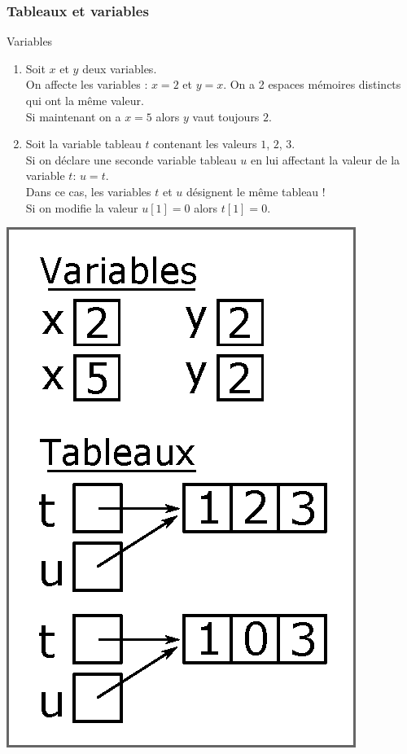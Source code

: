 \documentclass[9pt]{beamer}
\newcounter{num}
\begin{document}
\begin{frame}
\frametitle{Tableaux et variables}

\begin{block}{Variables}
\begin{minipage}{0.7\textwidth}
\begin{enumerate}
\item Soit $x$ et $y$ deux variables.\\
On affecte les variables : $x=2$ et $y=x$. On a 2 espaces mémoires distincts qui ont la même valeur.\\
Si maintenant on a $x=5$ alors $y$ vaut toujours $2$.
\item Soit la variable tableau $t$ contenant les valeurs $1$, $2$, $3$.\\
Si on déclare une seconde variable tableau $u$ en lui affectant la valeur de la variable $t$: $u=t$.\\
Dans ce cas, les variables $t$ et $u$ désignent le même tableau !\\
Si on modifie la valeur $u[1]=0$ alors $t[1]=0$.
\end{enumerate}
\end{minipage}\hfill
\begin{minipage}{0.28\textwidth}
\includegraphics[scale=0.5]{img/tableaux.eps}
\end{minipage}
\end{block}



\end{frame}
\end{document}
